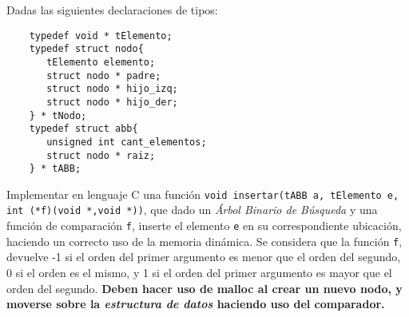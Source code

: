 \documentclass[12pt,a4paper]{article}
\begin{document}
 Dadas las siguientes declaraciones de tipos:
\begin{verbatim}
	typedef void * tElemento;
	typedef struct nodo{
	   tElemento elemento;
	   struct nodo * padre;
	   struct nodo * hijo_izq;
	   struct nodo * hijo_der;
	} * tNodo;
	typedef struct abb{
	   unsigned int cant_elementos;
	   struct nodo * raiz;
	} * tABB;
\end{verbatim}
Implementar en lenguaje C una función \texttt{void insertar(tABB a, tElemento e, int (*f)(void *,void *))}, que dado un \emph{Árbol Binario de Búsqueda} y una función de comparación \texttt{f}, inserte el elemento \texttt{e} en su correspondiente ubicación, haciendo un correcto uso de la memoria dinámica. Se considera que la función \texttt{f}, devuelve -1 si el orden del primer argumento es menor que el orden del segundo, 0 si el orden es el mismo, y 1 si el orden del primer argumento es mayor que el orden del segundo. \textbf{Deben hacer uso de malloc al crear un nuevo nodo, y moverse sobre la \emph{estructura de datos} haciendo uso del comparador.}

\end{document}
